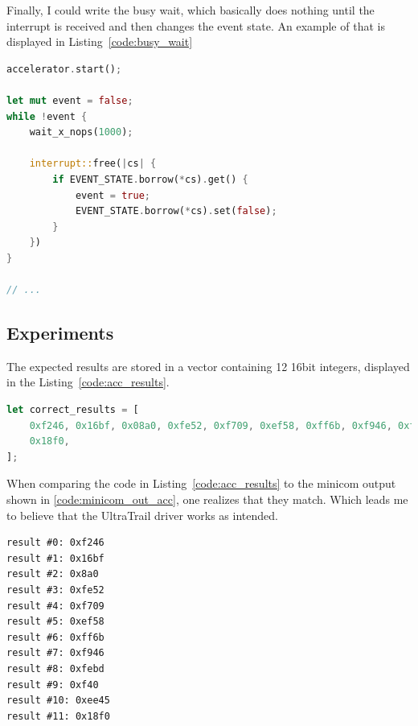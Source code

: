 Finally, I could write the busy wait, which basically does nothing until the interrupt is received
and then changes the event state.
An example of that is displayed in Listing~\ref{code:busy_wait}

\begin{lstlisting}[style=colorEX,language=Rust,caption={Snippet of the busy wait that waits for UltraTrail to finish},label={code:busy_wait}]
accelerator.start();

let mut event = false;
while !event {
    wait_x_nops(1000);

    interrupt::free(|cs| {
        if EVENT_STATE.borrow(*cs).get() {
            event = true;
            EVENT_STATE.borrow(*cs).set(false);
        }
    })
}

// ...
\end{lstlisting}

\subsection{Experiments}

The expected results are stored in a vector containing 12 16bit integers, displayed in the Listing~\ref{code:acc_results}.

\begin{lstlisting}[style=colorEX,language=Rust,caption={The expected results from the driver test},label={code:acc_results}]
let correct_results = [
    0xf246, 0x16bf, 0x08a0, 0xfe52, 0xf709, 0xef58, 0xff6b, 0xf946, 0xfebd, 0x0f40, 0xee45,
    0x18f0,
];
\end{lstlisting}

When comparing the code in Listing~\ref{code:acc_results} to the minicom output shown in \ref{code:minicom_out_acc},
one realizes that they match. Which leads me to believe that the UltraTrail driver works as intended.

\begin{lstlisting}[style=colorEx,caption={Minicom output after executing the driver test},label={code:minicom_out_acc}]
result #0: 0xf246
result #1: 0x16bf
result #2: 0x8a0
result #3: 0xfe52
result #4: 0xf709
result #5: 0xef58
result #6: 0xff6b
result #7: 0xf946
result #8: 0xfebd
result #9: 0xf40
result #10: 0xee45
result #11: 0x18f0
\end{lstlisting}



